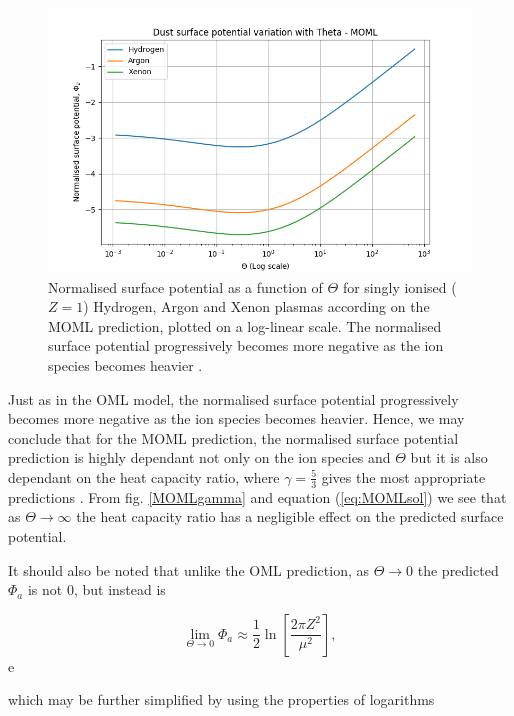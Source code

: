 \documentclass[journal]{Imperial_lab_report}
\begin{document}
\begin{figure}[H]
\centering
\includegraphics[width=\linewidth]{Output/MOMLgraph.jpeg}
\caption{Normalised surface potential as a function of $\Theta$ for singly ionised ($Z = 1$) Hydrogen, Argon and Xenon plasmas according on the MOML prediction, plotted on a log-linear scale. The normalised surface potential progressively becomes more negative as the ion species becomes heavier \cite{Thomas}.}
\label{MOMLgraph} 
\end{figure}

Just as in the OML model, the normalised surface potential progressively becomes more negative as the ion species becomes heavier. Hence, we may conclude that for the MOML prediction, the normalised surface potential prediction is highly dependant not only on the ion species and $\Theta$ but it is also dependant on the heat capacity ratio, where $\gamma = \frac{5}{3}$ gives the most appropriate predictions \cite{Willis}. From fig. \ref{MOMLgamma} and equation (\ref{eq:MOMLsol}) we see that as $\Theta \xrightarrow{} \infty$ the heat capacity ratio has a negligible effect on the predicted surface potential. 

\medskip

\noindent It should also be noted that unlike the OML prediction, as $\Theta \xrightarrow{} 0$ the predicted $\Phi_a$ is not 0, but instead is 

\begin{equation}\label{eq:MOMlLimNotSimplified}
\lim_{\Theta \to 0} \Phi_a \approx \frac{1}{2}\ln{\left[\frac{2\pi Z^2}{\mu^2}\right]},
\end{equation}e

\noindent which may be further simplified by using the properties of logarithms 
\end{document}
